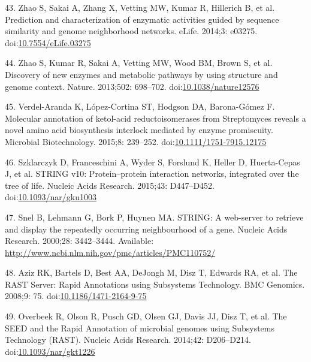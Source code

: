 \documentclass[12pt,twoside]{reedthesis}
\begin{document}
  \hypertarget{ref-zhaoux5fpredictionux5f2014}{}
  43. Zhao S, Sakai A, Zhang X, Vetting MW, Kumar R, Hillerich B, et al.
  Prediction and characterization of enzymatic activities guided by
  sequence similarity and genome neighborhood networks. eLife. 2014;3:
  e03275.
  doi:\href{https://doi.org/10.7554/eLife.03275}{10.7554/eLife.03275}
  
  \hypertarget{ref-zhaoux5fdiscoveryux5f2013}{}
  44. Zhao S, Kumar R, Sakai A, Vetting MW, Wood BM, Brown S, et al.
  Discovery of new enzymes and metabolic pathways by using structure and
  genome context. Nature. 2013;502: 698--702.
  doi:\href{https://doi.org/10.1038/nature12576}{10.1038/nature12576}
  
  \hypertarget{ref-verdel-arandaux5fmolecularux5f2015}{}
  45. Verdel-Aranda K, López-Cortina ST, Hodgson DA, Barona-Gómez F.
  Molecular annotation of ketol-acid reductoisomerases from Streptomyces
  reveals a novel amino acid biosynthesis interlock mediated by enzyme
  promiscuity. Microbial Biotechnology. 2015;8: 239--252.
  doi:\href{https://doi.org/10.1111/1751-7915.12175}{10.1111/1751-7915.12175}
  
  \hypertarget{ref-szklarczykux5fstringux5f2015}{}
  46. Szklarczyk D, Franceschini A, Wyder S, Forslund K, Heller D,
  Huerta-Cepas J, et al. STRING v10: Protein--protein interaction
  networks, integrated over the tree of life. Nucleic Acids Research.
  2015;43: D447--D452.
  doi:\href{https://doi.org/10.1093/nar/gku1003}{10.1093/nar/gku1003}
  
  \hypertarget{ref-snelux5fstring:ux5f2000}{}
  47. Snel B, Lehmann G, Bork P, Huynen MA. STRING: A web-server to
  retrieve and display the repeatedly occurring neighbourhood of a gene.
  Nucleic Acids Research. 2000;28: 3442--3444. Available:
  \url{http://www.ncbi.nlm.nih.gov/pmc/articles/PMC110752/}
  
  \hypertarget{ref-azizux5frastux5f2008}{}
  48. Aziz RK, Bartels D, Best AA, DeJongh M, Disz T, Edwards RA, et al.
  The RAST Server: Rapid Annotations using Subsystems Technology. BMC
  Genomics. 2008;9: 75.
  doi:\href{https://doi.org/10.1186/1471-2164-9-75}{10.1186/1471-2164-9-75}
  
  \hypertarget{ref-overbeekux5fseedux5f2014}{}
  49. Overbeek R, Olson R, Pusch GD, Olsen GJ, Davis JJ, Disz T, et al.
  The SEED and the Rapid Annotation of microbial genomes using Subsystems
  Technology (RAST). Nucleic Acids Research. 2014;42: D206--D214.
  doi:\href{https://doi.org/10.1093/nar/gkt1226}{10.1093/nar/gkt1226}
  
\end{document}
